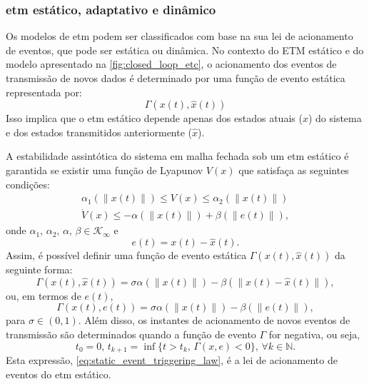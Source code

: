 \subsubsection{\acrshort{etm} estático, adaptativo e dinâmico} \label{section:etm_classification}

Os modelos de \acrshort{etm} podem ser classificados com base na sua lei de acionamento de eventos, que pode ser estática ou dinâmica. No contexto do ETM estático e do modelo apresentado na \autoref{fig:closed_loop_etc}, o acionamento dos eventos de transmissão de novos dados é determinado por uma função de evento estática representada por: \begin{equation}
  \Gamma(x(t), \hat{x}(t)) \label{eq:static_gamma_function_1}
\end{equation} Isso implica que o \acrshort{etm} estático depende apenas dos estados atuais ($x$) do sistema e dos estados transmitidos anteriormente ($\hat{x}$).

A estabilidade assintótica do sistema em malha fechada sob um \acrshort{etm} estático é garantida se existir uma função de Lyapunov $V(x)$ que satisfaça as seguintes condições: \begin{gather}
  \alpha_1(\| x(t) \|) \leq V(x) \leq \alpha_2(\| x(t) \|) \label{eq:static_etm_v} \\[8pt]
  \dot{V}(x) \leq - \alpha(\|x(t)\|) + \beta(\|e(t)\|), \label{eq:static_etm_dot_v_1}
\end{gather} onde $ \alpha_1 , \, \alpha_2, \, \alpha, \, \beta \in \mathcal{K}_\infty $ e \begin{equation}
  e(t) = x(t) - \hat{x}(t).
\end{equation} Assim, é possível definir uma função de evento estática $ \Gamma(x(t), \hat{x}(t)) $ da seguinte forma: \begin{equation}
  \Gamma(x(t), \hat{x}(t)) = \sigma \alpha(\|x(t)\|)- \beta(\|x(t) - \hat{x}(t)\|),
\end{equation} ou, em termos de $e(t)$, \begin{equation}
  \Gamma(x(t), e(t)) = \sigma \alpha(\|x(t)\|)- \beta(\|e(t)\|),
  \label{eq:static_gamma_function_2}
\end{equation} 
para $ \sigma \in (0, 1) $. Além disso, os instantes de acionamento de novos eventos de transmissão são determinados quando a função de evento $\Gamma$ for negativa, ou seja, \begin{equation}
  t_0 = 0, \, t_{k+1} = \inf\{t > t_k, \, \Gamma(x, e) < 0\}, \, \forall k \in \mathbb{N}. \label{eq:static_event_triggering_law}
\end{equation} Esta expressão, \eqref{eq:static_event_triggering_law}, é a lei de acionamento de eventos do \acrshort{etm} estático. 

